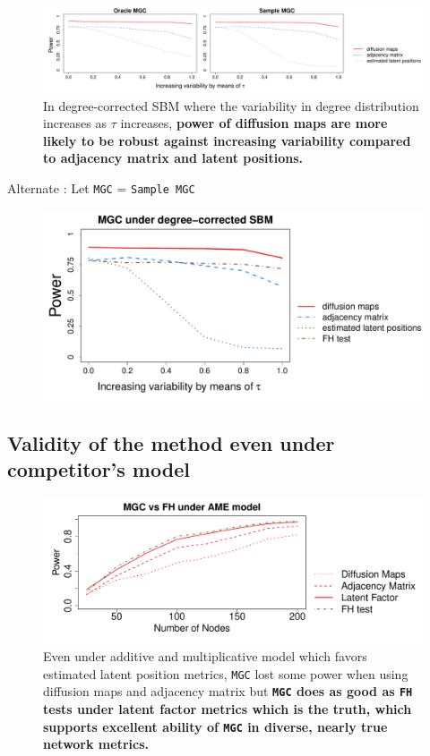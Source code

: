 \documentclass[12pt]{article}
\begin{document}
\begin{figure}[h]
	\centering
		\includegraphics[width=\linewidth]{../Figure/powerplot_var.pdf}
	\caption{In degree-corrected SBM where the variability in degree distribution increases as $\tau$ increases, \textbf{power of diffusion maps are more likely to be robust against increasing variability compared to adjacency matrix and latent positions.}}
	\label{fig:dcSBM}
\end{figure}	

Alternate : Let \texttt{MGC} = \texttt{Sample MGC}

\begin{figure}[H]
	\centering
	\includegraphics[width=\linewidth]{../Figure/powerplot_var_simple.pdf}
\end{figure}	


\newpage
\subsection*{Validity of the method even under competitor's model}

\begin{figure}[H]
	\centering
	\includegraphics[width=\linewidth]{../Figure/ame_part.pdf}
	\caption{Even under additive and multiplicative model which favors estimated latent position metrics, \texttt{MGC} lost some power when using diffusion maps and adjacency matrix but \textbf{\texttt{MGC} does as good as \texttt{FH} tests under latent factor metrics which is the truth, which supports excellent ability of \texttt{MGC} in diverse, nearly true network metrics.}}
	\label{fig:ame}
\end{figure}	
\end{document}
